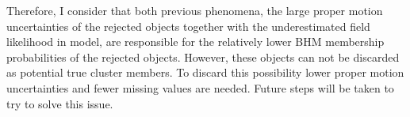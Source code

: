 Therefore, I consider that both previous phenomena, the large proper motion uncertainties of the rejected objects together with the underestimated field likelihood in \citet{Bouy2015} model, are responsible for the relatively lower BHM membership probabilities of the rejected objects. However, these objects can not be discarded as potential true cluster members. To discard this possibility lower proper motion uncertainties and fewer missing values are needed. Future steps will be taken to try to solve this issue.

 \begin{figure}[ht!]
\begin{center}

\end{center}
\end{figure}

